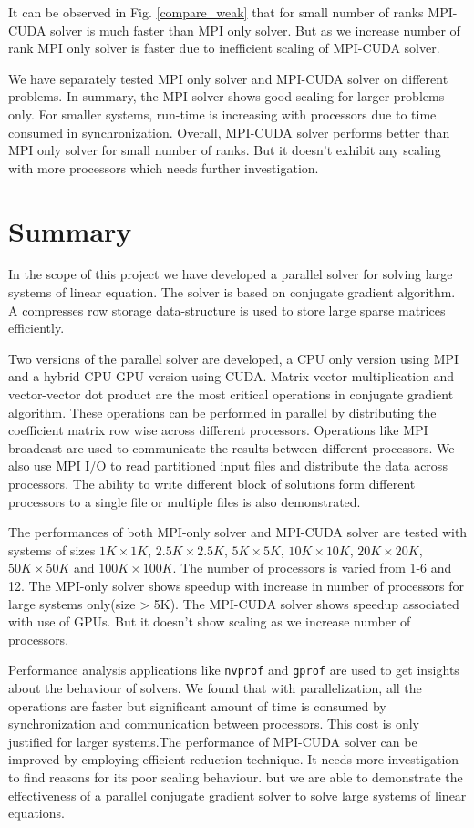 \documentclass[sigplan,screen]{acmart}
\begin{document}
It can be observed in Fig. \ref{compare_weak} that for small number of ranks MPI-CUDA solver is much faster than MPI only solver. But as we increase number of rank MPI only solver is faster due to inefficient scaling of MPI-CUDA solver. 

We have separately tested MPI only solver and MPI-CUDA solver on different problems. In summary, the MPI solver shows good scaling for larger problems only. For smaller systems, run-time is increasing with processors due to time consumed in synchronization. Overall, MPI-CUDA solver performs better than MPI only solver for small number of ranks. But it doesn't exhibit any scaling with more processors which needs further investigation. 

\section{Summary}
In the scope of this project we have developed a parallel solver for solving large systems of linear equation. The solver is based on conjugate gradient algorithm. A compresses row storage data-structure is used to store large sparse matrices efficiently. 

Two versions of the parallel solver are developed, a CPU only version using MPI and a hybrid CPU-GPU version using CUDA. Matrix vector multiplication and vector-vector dot product are the most critical operations in conjugate gradient algorithm. These operations can be performed in parallel by distributing the coefficient matrix row wise across different processors. Operations like MPI broadcast are used to communicate the results between different processors. We also use MPI I/O to read partitioned input files and distribute the data across processors. The ability to write different block of solutions form different processors to a single file or multiple files is also demonstrated. 

The performances of both MPI-only solver and MPI-CUDA solver are tested with systems of sizes $1K\times 1K$, $2.5K\times 2.5K$, $5K\times 5K$, $10K\times 10K$, $20K\times 20K$, $50K\times 50K$ and $100K\times 100K$. The number of processors is varied from 1-6 and 12. The MPI-only solver shows speedup with increase in number of processors for  large systems only(size > 5K). The MPI-CUDA solver shows speedup associated with use of GPUs. But it doesn't show scaling as we increase number of processors. 

Performance analysis applications like \texttt{nvprof} and \texttt{gprof} are used to get insights about the behaviour of solvers. We found that with parallelization, all the operations are faster but significant amount of time is consumed by synchronization and communication between processors. This cost is only justified for larger systems.The performance of MPI-CUDA solver can be improved by employing efficient reduction technique. It needs more investigation to find reasons for its poor scaling behaviour. but we are able to demonstrate the effectiveness of a parallel conjugate gradient solver to solve large systems of linear equations.



\end{document}
